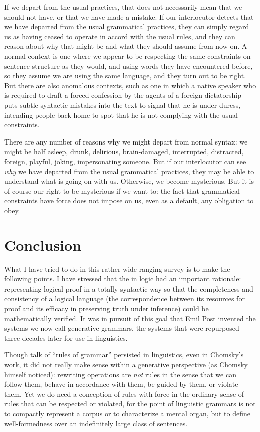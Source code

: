 \documentclass[output=paper]{langscibook}
\begin{document}
If we depart from the usual practices, that does not necessarily mean that we should not have, or that we have made a mistake.  If our interlocutor detects that we have departed from the usual grammatical practices, they can simply regard us as having ceased to operate in accord with the usual rules, and they can reason about why that might be and what they should assume from now on. A normal context is one where we appear to be respecting the same constraints on sentence structure as they would, and using words they have encountered before, so they assume we are using the same language, and they turn out to be right. But there are also anomalous contexts, such as one in which a native speaker who is required to draft a forced confession by the agents of a foreign dictatorship puts subtle syntactic mistakes into the text to signal that he is under duress, intending people back home to spot that he is not complying with the usual constraints.

There are any number of reasons why we might depart from normal syntax: we might be half asleep, drunk, delirious, brain-damaged, interrupted, distracted, foreign, playful, joking, impersonating someone. But if our interlocutor can see \emph{why} we have departed from the usual grammatical practices, they may be able to understand what is going on with us. Otherwise, we become mysterious. But it is of course our right to be mysterious if we want to: the fact that grammatical constraints have  force does not impose on us, even as a default, any obligation to obey.

\section{Conclusion}
\label{sec:pullum:conc}

What I have tried to do in this rather wide-ranging survey is to make the following points. I have stressed that the  in logic had an important rationale: representing logical proof in a totally syntactic way so that the completeness and consistency of a logical language (the correspondence between its resources for proof and its efficacy in preserving truth under inference) could be mathematically verified.  It was in pursuit of this goal that Emil Post invented the systems we now call generative grammars, the systems that were repurposed three decades later for use in linguistics.

Though talk of ``rules of grammar'' persisted in linguistics, even in Chomsky's work, it did not really make sense within a generative perspective (as Chomsky himself noticed): rewriting operations are \emph{not} rules in the sense that we can follow them, behave in accordance with them, be guided by them, or violate them.  Yet we do need a conception of rules with  force in the ordinary sense of rules that can be respected or violated, for the point of linguistic grammars is not to compactly represent a corpus or to characterize a mental organ, but to define well-formedness over an indefinitely large class of sentences.
\end{document}
